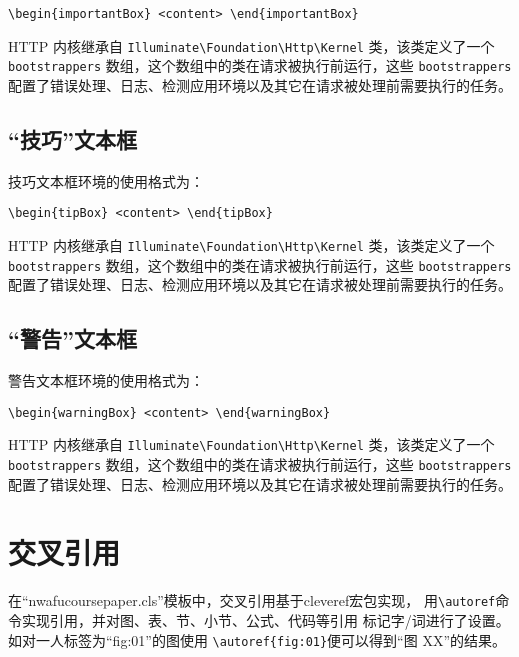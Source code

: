 \documentclass{nwafucoursepaper}
\begin{document}
\verb|\begin{importantBox} <content> \end{importantBox}|

\begin{importantBox}
  HTTP 内核继承自 \verb|Illuminate\Foundation\Http\Kernel| 类，该类定义了一个 \verb|bootstrappers| 数组，这个数组中的类在请求被执行前运行，这些 \verb|bootstrappers| 配置了错误处理、日志、检测应用环境以及其它在请求被处理前需要执行的任务。
\end{importantBox}
\subsection{\enquote{技巧}文本框}
技巧文本框环境的使用格式为：

\verb|\begin{tipBox} <content> \end{tipBox}|

\begin{tipBox}
  HTTP 内核继承自 \verb|Illuminate\Foundation\Http\Kernel| 类，该类定义了一个 \verb|bootstrappers| 数组，这个数组中的类在请求被执行前运行，这些 \verb|bootstrappers| 配置了错误处理、日志、检测应用环境以及其它在请求被处理前需要执行的任务。
\end{tipBox}
\subsection{\enquote{警告}文本框}
警告文本框环境的使用格式为：

\verb|\begin{warningBox} <content> \end{warningBox}|

\begin{warningBox}
  HTTP 内核继承自 \verb|Illuminate\Foundation\Http\Kernel| 类，该类定义了一个 \verb|bootstrappers| 数组，这个数组中的类在请求被执行前运行，这些 \verb|bootstrappers| 配置了错误处理、日志、检测应用环境以及其它在请求被处理前需要执行的任务。
\end{warningBox}

\section{交叉引用}
在\enquote{nwafucoursepaper.cls}模板中，交叉引用基于cleveref宏包实现，
用\verb|\autoref|命令实现引用，并对图、表、节、小节、公式、代码等引用
标记字/词进行了设置。如对一人标签为\enquote{fig:01}的图使用
\verb|\autoref{fig:01}|便可以得到\enquote{图 XX}的结果。
\end{document}
